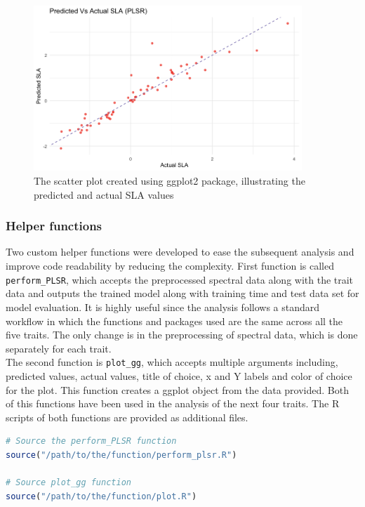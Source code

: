 \documentclass[12pt,a4paper]{report}
\begin{document}
\begin{figure}[h]
    \centering
    \includegraphics[width=0.9\textwidth]{Figures/sla_plsr.png}
    \caption{The scatter plot created using ggplot2 package, illustrating the predicted and actual SLA values }
    \label{fig:sla_plsr}
\end{figure}

\subsubsection*{Helper functions}
Two custom helper functions were developed to ease the subsequent analysis and improve code readability by reducing the complexity. First function is called \texttt{perform\_PLSR}, which accepts the preprocessed spectral data along with the trait data and outputs the trained model along with training time and test data set for model evaluation. It is highly useful since the analysis follows a standard workflow in which the functions and packages used are the same across all the five traits. The only change is in the preprocessing of spectral data, which is done separately for each trait.\\

The second function is \texttt{plot\_gg}, which accepts multiple arguments including, predicted values, actual values, title of choice, x and Y labels and color of choice for the plot. This function creates a ggplot object from the data provided. Both of this functions have been used in the analysis of the next four traits. The R scripts of both functions are provided as additional files. \\

\begin{lstlisting}[language=R, style=mystyle]
# Source the perform_PLSR function
source("/path/to/the/function/perform_plsr.R")

# Source plot_gg function
source("/path/to/the/function/plot.R")
\end{lstlisting}
\end{document}
